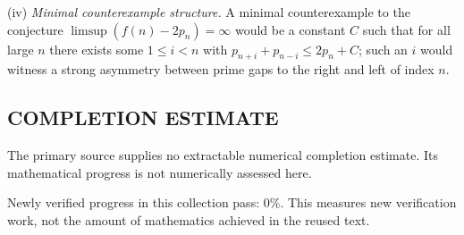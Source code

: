 (iv) \emph{Minimal counterexample structure.} A minimal counterexample to the conjecture $\limsup(f(n)-2p_n)=\infty$ would be a constant $C$ such that for all large $n$ there exists some $1\le i<n$ with $p_{n+i}+p_{n-i}\le 2p_n+C$; such an $i$ would witness a strong asymmetry between prime gaps to the right and left of index $n$.




\subsection*{COMPLETION ESTIMATE}
The primary source supplies no extractable numerical completion estimate. Its mathematical progress is not numerically assessed here.

Newly verified progress in this collection pass: $0\%$. This measures new verification work, not the amount of mathematics achieved in the reused text.
